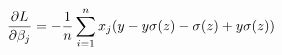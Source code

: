 \documentclass[preview]{standalone}
\begin{document}
\begin{align*}
\special{dvisvgm:raw <g id='unique000'>}\frac{\partial{L}}{\partial\beta_j}=-\frac{1}{n}\sum^n_{i=1}x_j(y-y\sigma(z)-\sigma(z)+y\sigma(z))\special{dvisvgm:raw </g>}
\end{align*}
\end{document}
